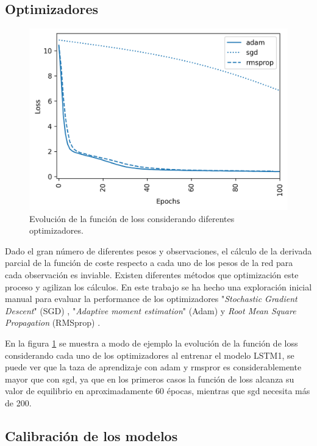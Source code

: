 \subsection{Optimizadores}

\begin{figure}[h!]
  \begin{center}
    \includegraphics[height=3.in]{Figures/optims.png}
    \caption{ Evolución de la función de loss considerando diferentes optimizadores.}
    \label{opt}
  \end{center}
\end{figure}

Dado el gran número de diferentes pesos y observaciones, el cálculo de la derivada parcial de la función de coste 
respecto a cada uno de los pesos de la red para cada observación es inviable. Existen diferentes métodos que optimización
este proceso y agilizan los cálculos. En este trabajo se ha hecho una exploración inicial manual para evaluar 
la performance de los optimizadores 
"\textit{Stochastic Gradient Descent}" (SGD) \cite{optim}, "\textit{Adaptive moment estimation}" (Adam) \cite{adam} y 
\textit{Root Mean Square Propagation} (RMSprop) \cite{optim}.



En la figura \ref{opt} se muestra a modo de ejemplo la evolución de la función de loss considerando cada uno de los 
optimizadores al entrenar el modelo LSTM1, se puede ver que la taza de aprendizaje con adam y rmspror es considerablemente
mayor que con sgd, ya que en los primeros casos la función de loss alcanza su valor de equilibrio en aproximadamente 
60 épocas, mientras que sgd necesita más de 200. 



\subsection{Calibración de los modelos}
\label{cal}

